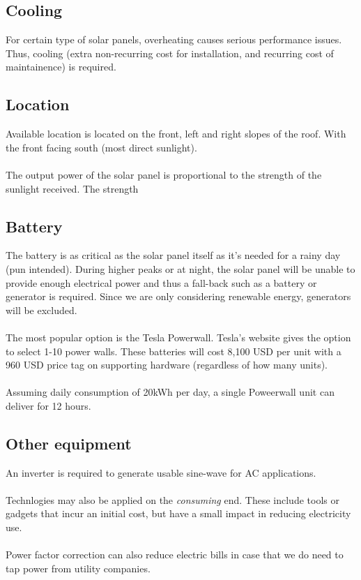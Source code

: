 \documentclass[10pt,letterpaper]{article}
\begin{document}
\subsection{Cooling}

For certain type of solar panels, overheating causes serious performance issues. Thus, cooling (extra non-recurring cost for installation, and recurring cost of maintainence) is required.\cite{pv-solar-cooling}\\

\subsection{Location}
Available location is located on the front, left and right slopes of the roof. With the front facing south (most direct sunlight).\\
\\
The output power of the solar panel is proportional to the strength of the sunlight received. The strength 

\subsection{Battery}

The battery is as critical as the solar panel itself as it's needed for a rainy day (pun intended). During higher peaks or at night, the solar panel will be unable to provide enough electrical power and thus a fall-back such as a battery or generator is required. Since we are only considering renewable energy, generators will be excluded.\\
\\
The most popular option is the Tesla Powerwall\cite{tesla-powerwall}. Tesla's website gives the option to select 1-10 power walls. These batteries will cost 8,100 USD per unit with a 960 USD price tag on supporting hardware (regardless of how many units).\\
\\
Assuming daily consumption of 20kWh per day, a single Poweerwall unit can deliver for 12 hours.\\

\subsection{Other equipment}

An inverter is required to generate usable sine-wave for AC applications.\\
\\
Technlogies may also be applied on the \textit{consuming} end. These include tools or gadgets that incur an initial cost, but have a small impact in reducing electricity use.\\
\\
Power factor correction can also reduce electric bills in case that we do need to tap power from utility companies.\\
\end{document}
